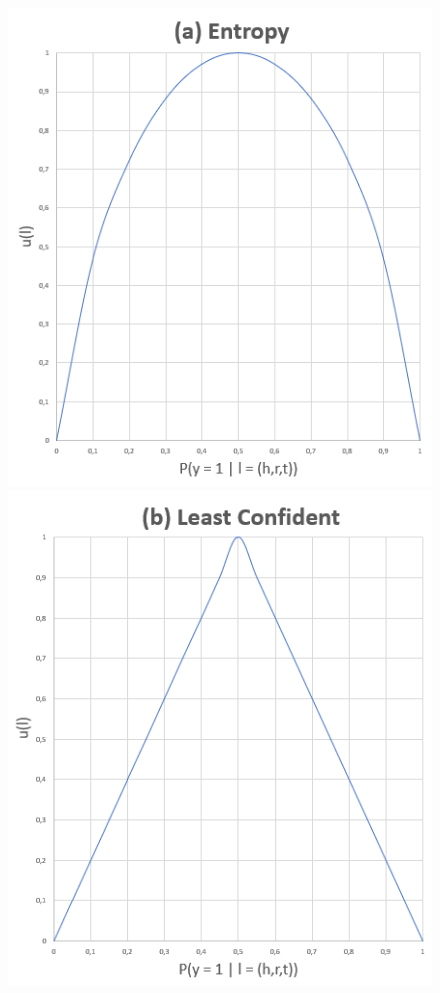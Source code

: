 \begin{figure}
    \centering
    \begin{minipage}{.5\textwidth}
      \centering
      \includegraphics[width=0.9\linewidth]{figures/entropy_graph.PNG}
    \end{minipage}%
    \begin{minipage}{.5\textwidth}
      \centering
      \includegraphics[width=0.9\linewidth]{figures/least_confident_graph.PNG}

\end{minipage}
\end{figure}
